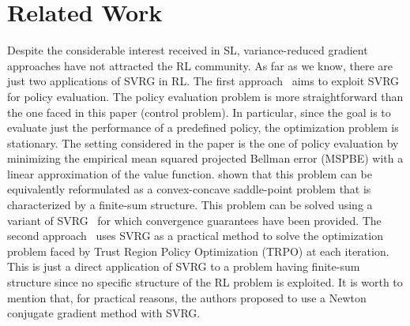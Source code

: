 \documentclass{article}
\theoremstyle{remark}
\theoremstyle{definition}
\begin{document}
\vspace{-0.05in}
\section{Related Work}
\vspace{-0.05in}
Despite the considerable interest received in SL, variance-reduced gradient approaches have not attracted the RL community.
As far as we know, there are just two applications of SVRG in RL.
The first approach~\citep{du2017svrgpe} aims to exploit SVRG for policy evaluation.
The policy evaluation problem is more straightforward than the one faced in this paper (control problem).
In particular, since the goal is to evaluate just the performance of a predefined policy, the optimization problem is stationary.
The setting considered in the paper is the one of policy evaluation by minimizing the empirical mean squared projected Bellman error (MSPBE) with a linear approximation of the value function. \citet{du2017svrgpe} shown that this problem can be equivalently reformulated as a convex-concave saddle-point problem that is characterized by a finite-sum structure.
This problem can be solved using a variant of SVRG~\citep{Palaniappan2016svrgsaddle} for which convergence guarantees have been provided.
The second approach~\citep{xu2017svrgtrpo} uses SVRG as a practical method to solve the optimization problem faced by Trust Region Policy Optimization (TRPO) at each iteration. This is just a direct application of SVRG to a problem having finite-sum structure since no specific structure of the RL problem is exploited.
It is worth to mention that, for practical reasons, the authors proposed to use a Newton conjugate gradient method with SVRG.
\end{document}
